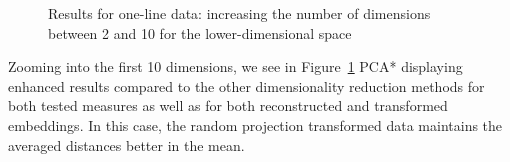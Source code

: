 \documentclass[pdftex,12pt,a4paper]{report}
\begin{document}
\begin{figure}[!htb]
    \caption{Results for one-line data: increasing the number of dimensions between 2 and 10 for the lower-dimensional space}\label{fig:avg_dev_dyn_low_oneline_zoom}
\end{figure}

Zooming into the first 10 dimensions, we see in Figure~\ref{fig:avg_dev_dyn_low_oneline_zoom} PCA* displaying enhanced results compared to the other dimensionality reduction methods for both tested measures as well as for both reconstructed and transformed embeddings. 
In this case, the random projection transformed data maintains the averaged distances better in the mean.
\end{document}
